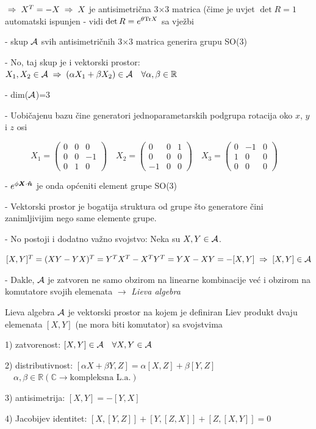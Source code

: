 $\;\Rightarrow\; X^T=-X \;\Rightarrow\; X$ je antisimetrična 3$\times$3 matrica (čime je uvjet
$\det R=1$ automatski ispunjen - vidi 
   $\det R = e^{\theta\textrm{\scriptsize Tr} X}$ sa vježbi

- skup $\mathcal{A}$ svih antisimetričnih 3$\times$3 matrica generira grupu SO(3)

- No, taj skup je i vektorski prostor: $X_1,X_2\in\mathcal{A}\;\Rightarrow\;
    (\alpha X_1 + \beta X_2)\in\mathcal{A} \quad \forall \alpha, \beta\in\mathbb{R}$

- dim($\mathcal{A}$)=3

- Uobičajenu bazu čine generatori jednoparametarskih podgrupa rotacija oko
  $x$, $y$ i $z$ osi

\begin{equation}
X_1=\left(
\begin{array}{ccc}
0 & 0 & 0 \\ 
0 & 0 &-1 \\
0 & 1 & 0
\end{array} \right) \quad
X_2=\left(
\begin{array}{ccc}
0 & 0 & 1 \\ 
0 & 0 & 0 \\
-1& 0 & 0
\end{array} \right) \quad
X_3=\left(
\begin{array}{ccc}
0 & -1 & 0 \\ 
1& 0 & 0 \\
0 & 0 & 0
\end{array} \right) \quad
\label{eq:SO3generators}
\end{equation}

- $e^{\phi \vec{X}\cdot\unitn}$ je onda općeniti element grupe SO(3)

- Vektorski prostor je bogatija struktura od grupe što generatore
 čini zanimljivijim nego same elemente grupe.

- No postoji i dodatno važno svojstvo: Neka su $X,Y\in\mathcal{A}$.

$[X,Y]^T = (XY-YX)^T = Y^T X^T - X^T Y^T = YX-XY = -[X,Y] \;\Rightarrow\; [X,Y]\in\mathcal{A}$

- Dakle, $\mathcal{A}$ je zatvoren ne samo obzirom na linearne kombinacije već
   i obzirom na komutatore svojih elemenata $\to$ \emph{Lieva algebra}

\begin{definicija}
Lieva algebra $\mathcal{A}$ je vektorski prostor na kojem je definiran 
Liev produkt dvaju elemenata $[X,Y]$ (ne mora biti komutator) sa svojstvima

1) zatvorenost: $[X,Y]\in\mathcal{A} \quad \forall X,Y\in\mathcal{A}$

2) distributivnost: $[\alpha X + \beta Y, Z]=\alpha[X,Z]+\beta[Y,Z]$
$\quad \alpha,\beta \in \mathbb{R} (\mathbb{C} \to \textrm{kompleksna L.a.})$

3) antisimetrija: $[X,Y]=-[Y,X]$

4) Jacobijev identitet: $[X, [Y, Z]]+[Y, [Z, X]]+[Z, [X, Y]]=0$
\end{definicija}

